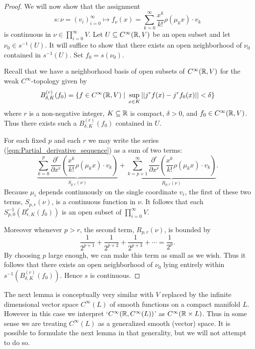 \documentclass{article}
\newtheorem{proposed work}[theorem]{Proposed Work}
\theoremstyle{definition}
\begin{document}
\begin{proof}
We will now show that the assignment
\begin{equation*}
	s: \nu = (v_i)_{i=0}^\infty \mapsto f_\nu(x) = \sum_{k=0}^\infty \frac{x^k}{k!} \rho(\mu_k x) \cdot v_k
\end{equation*}
  is continuous in $\nu \in \prod_{i=0}^\infty V $. Let $U \subseteq C^\infty(\mathbb R, V)$ be an open subset and let $\nu_0 \in s^{-1}(U)$. It will suffice to show that there exists an open neighborhood of $\nu_0$ contained in $s^{-1}(U)$. Set $f_0 = s(\nu_0)$.

Recall that we have a neighborhood basis of open subsets of $C^\infty(\mathbb R, V)$ for the weak $C^\infty$-topology given by
\begin{equation*}
	B^{(r)}_{\delta,K}(f_0) = \{ f \in C^\infty(\mathbb R, V) \; | \; \sup_{x \in K}|| j^rf(x) - j^rf_0(x) || < \delta \}
\end{equation*} 
where $r$ is a non-negative integer, $K \subseteq \mathbb R$ is compact, $\delta > 0$, and $f_0 \in C^\infty(\mathbb R, V)$. Thus there exists such a $B^{(r)}_{\delta, K}(f_0)$ contained in $U$. 

For each fixed $p$ and each $r$ we may write the series (\ref{eqn:Partial_derivative_sequence}) as a sum of two terms:
\begin{equation*}
		\underbrace{\sum_{k=0}^p \frac{\partial^r}{\partial x^r} \left( \frac{x^k}{k!} \rho(\mu_k x) \cdot v_k \right)}_{S_{p,r}(\nu)}
		+ 	\underbrace{\sum_{k=p+1}^\infty \frac{\partial^r}{\partial x^r} \left( \frac{x^k}{k!} \rho(\mu_k x) \cdot v_k \right)}_{R_{p,r}(\nu)}.
\end{equation*}
Because $\mu_i$ depends continuously on the single coordinate $v_i$, the first of these two terms, $S_{p,r}(\nu)$, is a continuous function in $\nu$. It follows that each $S_{p,0}^{-1}(B^r_{\epsilon, K}(f_0))$ is an open subset of $ \prod_{i=0}^\infty V $. 

Moreover whenever $p>r$, the second term, $R_{p,r}(\nu)$, is bounded by
\begin{equation*}
	\frac{1}{2^{p+1}}+ \frac{1}{2^{p+2}}+ \frac{1}{2^{p+3}}+ \cdots = \frac{1}{2^p}.
\end{equation*} 
By choosing $p$ large enough, we can make this term as small as we wish. Thus it follows that there exists an open neighborhood of $\nu_0$ lying entirely within $s^{-1}(B^{(r)}_{\delta, K}(f_0))$. Hence $s$ is continuous.
\end{proof}

The next lemma is conceptually very similar with $V$ replaced by the infinite dimensional vector space $C^\infty(L)$ of smooth functions on a compact manifold $L$. However in this case we interpret `$C^\infty(\mathbb R, C^\infty(L))$' as $C^\infty(\mathbb R \times L)$. Thus in some sense we are treating $C^\infty(L)$ as a generalized smooth (vector) space. It is possible to formulate the next lemma in that generality, but we will not attempt to do so.  
\end{document}
